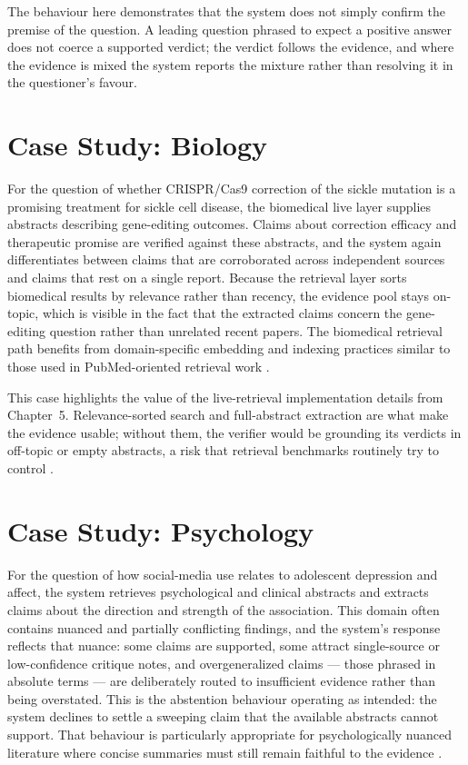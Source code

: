 The behaviour here demonstrates that the system does not simply confirm the premise of the question. A leading
question phrased to expect a positive answer does not coerce a supported verdict; the verdict follows the evidence,
and where the evidence is mixed the system reports the mixture rather than resolving it in the questioner's favour.

\section{Case Study: Biology }

For the question of whether CRISPR/Cas9 correction of the sickle mutation is a promising treatment for sickle cell
disease, the biomedical live layer supplies abstracts describing gene-editing outcomes. Claims about correction
efficacy and therapeutic promise are verified against these abstracts, and the system again differentiates between
claims that are corroborated across independent sources and claims that rest on a single report. Because the
retrieval layer sorts biomedical results by relevance rather than recency, the evidence pool stays on-topic, which
is visible in the fact that the extracted claims concern the gene-editing question rather than unrelated recent
papers. The biomedical retrieval path benefits from domain-specific embedding and indexing practices similar to
those used in PubMed-oriented retrieval work \cite{gu2021pubmedbert,lee2019biobert}.

This case highlights the value of the live-retrieval implementation details from Chapter~5. Relevance-sorted search
and full-abstract extraction are what make the evidence usable; without them, the verifier would be grounding its
verdicts in off-topic or empty abstracts, a risk that retrieval benchmarks routinely try to control
\cite{petroni2020kilt,thakur2021beir}.

\section{Case Study: Psychology }

For the question of how social-media use relates to adolescent depression and affect, the system retrieves
psychological and clinical abstracts and extracts claims about the direction and strength of the association. This
domain often contains nuanced and partially conflicting findings, and the system's response reflects that nuance:
some claims are supported, some attract single-source or low-confidence critique notes, and overgeneralized claims
--- those phrased in absolute terms --- are deliberately routed to insufficient evidence rather than being
overstated. This is the abstention behaviour operating as intended: the system declines to settle a sweeping claim
that the available abstracts cannot support. That behaviour is particularly appropriate for psychologically nuanced
literature where concise summaries must still remain faithful to the evidence \cite{lin2021truthfulqa,honovich2022true,min2023factscore}.

